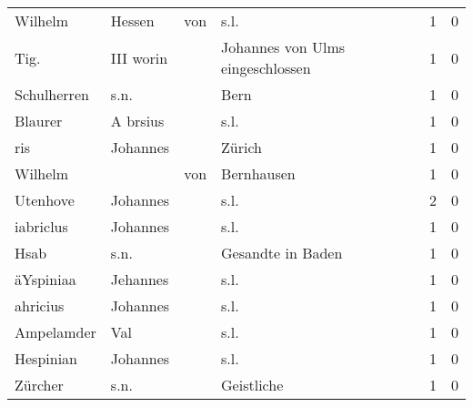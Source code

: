 \begin{center}
\begin{tiny}
\begin{longtabu}{llllrr}
                  Wilhelm &                             Hessen &         von &                                        s.l. &          1 &         0 \\
                     Tig. &                          III worin &             &            Johannes von Ulms eingeschlossen &          1 &         0 \\
              Schulherren &                               s.n. &             &                                        Bern &          1 &         0 \\
                  Blaurer &                           A brsius &             &                                        s.l. &          1 &         0 \\
                      ris &                           Johannes &             &                                      Zürich &          1 &         0 \\
                  Wilhelm &                                    &         von &                                  Bernhausen &          1 &         0 \\
                 Utenhove &                           Johannes &             &                                        s.l. &          2 &         0 \\
                iabriclus &                           Johannes &             &                                        s.l. &          1 &         0 \\
                     Hsab &                               s.n. &             &                           Gesandte in Baden &          1 &         0 \\
                äYspiniaa &                           Jehannes &             &                                        s.l. &          1 &         0 \\
                 ahricius &                           Johannes &             &                                        s.l. &          1 &         0 \\
               Ampelamder &                                Val &             &                                        s.l. &          1 &         0 \\
                Hespinian &                           Johannes &             &                                        s.l. &          1 &         0 \\
                  Zürcher &                               s.n. &             &                                  Geistliche &          1 &         0 \\

\end{longtabu}
\end{tiny}
\end{center}
